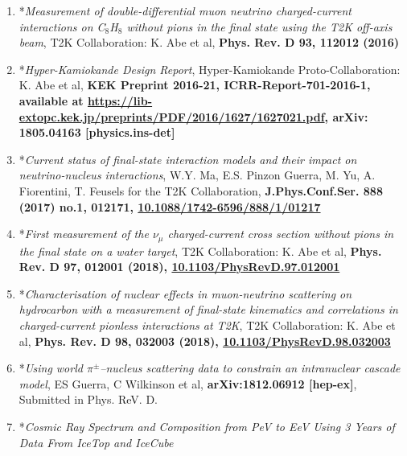 \documentclass[11pt,a4paper,oneside,fleqn]{article}
\begin{document}
{\begin{enumerate}
\item *\textit{Measurement of double-differential muon neutrino charged-current interactions on C$_8$H$_8$ without pions in the final state using the T2K off-axis beam}, T2K Collaboration: K. Abe et al, \textbf{Phys. Rev. D 93, 112012 (2016)}
\item *\textit{Hyper-Kamiokande Design Report}, Hyper-Kamiokande Proto-Collaboration: K. Abe et al, \textbf{KEK Preprint 2016-21, ICRR-Report-701-2016-1, available at \url{https://lib-extopc.kek.jp/preprints/PDF/2016/1627/1627021.pdf}, arXiv: 1805.04163 [physics.ins-det]}
\item *\textit{Current status of final-state interaction models and their impact on neutrino-nucleus interactions}, W.Y. Ma, E.S. Pinzon Guerra, M. Yu, A. Fiorentini, T. Feusels for the T2K Collaboration, \textbf{J.Phys.Conf.Ser. 888 (2017) no.1, 012171, \href{https://doi.org/10.1088/1742-6596/888/1/012171}{10.1088/1742-6596/888/1/01217}}
\item *\textit{First measurement of the $\nu_\mu$ charged-current cross section without pions in the final state on a water target}, T2K Collaboration: K. Abe et al, \textbf{Phys. Rev. D 97, 012001 (2018), \href{https://doi.org/10.1103/PhysRevD.97.012001}{10.1103/PhysRevD.97.012001}}
\item *\textit{Characterisation of nuclear effects in muon-neutrino scattering on hydrocarbon with a measurement of final-state kinematics and correlations in charged-current pionless interactions at T2K}, T2K Collaboration: K. Abe et al, \textbf{Phys. Rev. D 98, 032003 (2018), \href{https://doi.org/10.1103/PhysRevD.98.032003}{10.1103/PhysRevD.98.032003}} %
\item *\textit{Using world $\pi^{\pm}$--nucleus scattering data to constrain an intranuclear cascade model}, ES Guerra, C Wilkinson et al, \textbf{arXiv:1812.06912 [hep-ex]}, Submitted in Phys. ReV. D.
\item *\textit{Cosmic Ray Spectrum and Composition from PeV to EeV Using 3 Years of Data From IceTop and IceCube} 
\end{enumerate}




}
\end{document}
